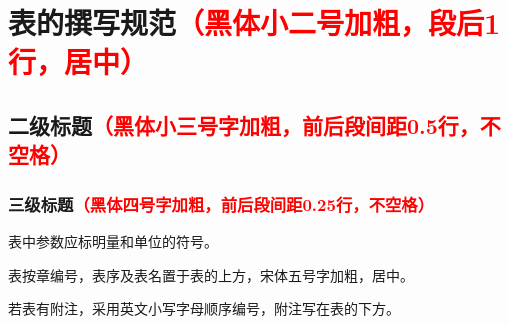 \chapter[表的撰写规范]{表的撰写规范{\song\xiaosi \textcolor{red}{（黑体小二号加粗，段后1行，居中）}}}

\section[二级标题]{二级标题{\song\xiaosi \textcolor{red}{（黑体小三号字加粗，前后段间距0.5行，不空格）}}}

\subsection[三级标题]{三级标题{\song\xiaosi \textcolor{red}{（黑体四号字加粗，前后段间距0.25行，不空格）}}}
表中参数应标明量和单位的符号。

表按章编号，表序及表名置于表的上方，宋体五号字加粗，居中。

若表有附注，采用英文小写字母顺序编号，附注写在表的下方。 

